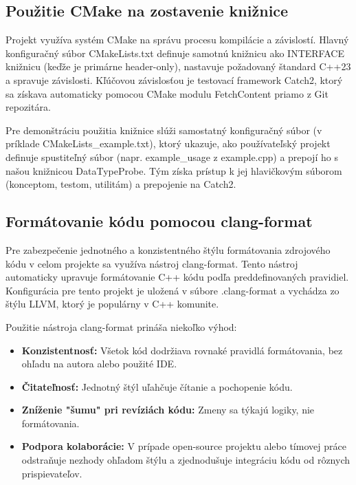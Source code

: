 \documentclass[11pt]{article}
\begin{document}
\subsection{Použitie CMake na zostavenie knižnice}

Projekt využíva systém CMake na správu procesu kompilácie a závislostí. Hlavný konfiguračný súbor CMakeLists.txt definuje samotnú knižnicu ako INTERFACE knižnicu (keďže je primárne header-only), nastavuje požadovaný štandard C++23 a spravuje závislosti. Kľúčovou závislosťou je testovací framework Catch2, ktorý sa získava automaticky pomocou CMake modulu FetchContent priamo z Git repozitára.

Pre demonštráciu použitia knižnice slúži samostatný konfiguračný súbor (v príklade CMakeLists\_example.txt), ktorý ukazuje, ako používateľský projekt definuje spustiteľný súbor (napr. example\_usage z example.cpp) a prepojí ho s našou knižnicou DataTypeProbe. Tým získa prístup k jej hlavičkovým súborom (konceptom, testom, utilitám) a prepojenie na Catch2.

\subsection{Formátovanie kódu pomocou clang-format}

Pre zabezpečenie jednotného a konzistentného štýlu formátovania zdrojového kódu v celom projekte sa využíva nástroj clang-format. Tento nástroj automaticky upravuje formátovanie C++ kódu podľa preddefinovaných pravidiel. Konfigurácia pre tento projekt je uložená v súbore .clang-format a vychádza zo štýlu LLVM, ktorý je populárny v C++ komunite.

\noindent Použitie nástroja clang-format prináša niekoľko výhod:

\begin{itemize}
  \item \textbf{Konzistentnosť:} Všetok kód dodržiava rovnaké pravidlá formátovania, bez ohľadu na autora alebo použité IDE.
  \item \textbf{Čitateľnosť:} Jednotný štýl uľahčuje čítanie a pochopenie kódu.
  \item \textbf{Zníženie "šumu" pri revíziách kódu:} Zmeny sa týkajú logiky, nie formátovania.
  \item \textbf{Podpora kolaborácie:} V prípade open-source projektu alebo tímovej práce odstraňuje nezhody ohľadom štýlu a zjednodušuje integráciu kódu od rôznych prispievateľov.
\end{itemize}
\end{document}
